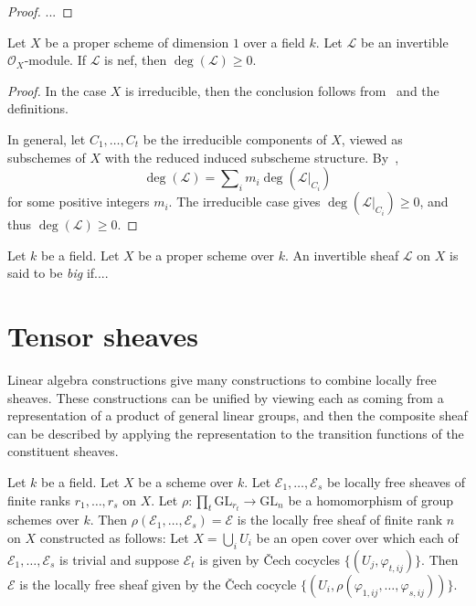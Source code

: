 \begin{proof}
...
\end{proof}

\begin{lemma}
\label{lemma-degree-of-nef-on-curve}
Let $X$ be a proper scheme of dimension $1$ over a field $k$.
Let $\mathcal{L}$ be an invertible $\mathcal{O}_X$-module.
If $\mathcal{L}$ is nef, then $\deg(\mathcal{L}) \geq 0$.
\end{lemma}

\begin{proof}
In the case $X$ is irreducible, then the conclusion follows from~
and the definitions.

In general, let $C_1,\ldots,C_t$ be the irreducible components of $X$, viewed
as subschemes of $X$ with the reduced induced subscheme structure.
By~,
$$
\deg(\mathcal{L}) = \sum\nolimits_i m_i\deg(\mathcal{L}|_{C_i})
$$
for some positive integers $m_i$.
The irreducible case gives $\deg(\mathcal{L}|_{C_i}) \geq 0$, and thus
$\deg(\mathcal{L}) \geq 0$.
\end{proof}

\begin{definition}
Let $k$ be a field.
Let $X$ be a proper scheme over $k$.
An invertible sheaf $\mathcal{L}$ on $X$ is said to be \emph{big}
if....
\end{definition}

\section{Tensor sheaves}
\label{section-tensor-sheaves}
Linear algebra constructions give many constructions to combine locally free
sheaves.
These constructions can be unified by viewing each as coming from a
representation of a product of general linear groups, and then the composite
sheaf can be described by applying the representation to the transition
functions of the constituent sheaves.

\begin{definition}
\label{definition-tensor-sheaf}
Let $k$ be a field.
Let $X$ be a scheme over $k$.
Let $\mathcal{E}_1,\ldots,\mathcal{E}_s$ be locally free sheaves of finite
ranks $r_1,\ldots,r_s$ on $X$.
Let $\rho : \prod_t \mathrm{GL}_{r_t} \to \mathrm{GL}_n$ be a homomorphism of
group schemes over $k$.
Then $\rho(\mathcal{E}_1,\ldots,\mathcal{E}_s) = \mathcal{E}$ is the
locally free sheaf of finite rank $n$ on $X$ constructed as follows:
Let $X = \bigcup_i U_i$ be an open cover over which each of
$\mathcal{E}_1,\ldots,\mathcal{E}_s$ is trivial and suppose $\mathcal{E}_t$ is
given by \v{C}ech cocycles $\{(U_j,\varphi_{t,ij})\}$.
Then $\mathcal{E}$ is the locally free sheaf given by the \v{C}ech cocycle
$\{(U_i,\rho(\varphi_{1,ij},\ldots,\varphi_{s,ij}))\}$.
\end{definition}

